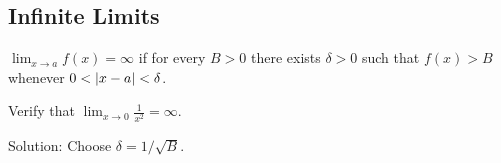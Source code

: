\documentclass[calc1-main.tex]{subfiles}
\begin{document}
\subsection*{Infinite Limits}
\begin{definition}
    $\lim_{x \to a} f(x) = \infty$ if for every $B>0$ there exists $\delta>0$ such that $f(x) > B$ whenever $0<\left\lvert x-a \right\rvert<\delta$.
\end{definition}

\begin{example}
    Verify that $\lim_{x \to 0} \frac{1}{x^2} = \infty$.

    Solution: Choose $\delta = 1/\sqrt{B}$.
\end{example}
\end{document}
